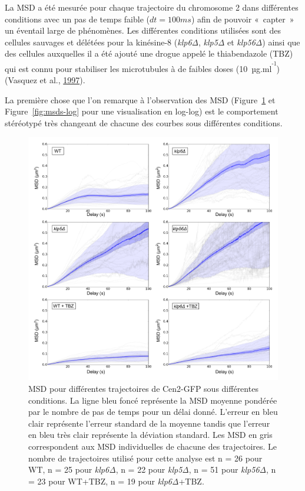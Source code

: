 \documentclass[12pt,a4paper,twoside,openright]{book}
\begin{document}
La MSD a été mesurée pour chaque trajectoire du chromosome 2 dans
différentes conditions avec un pas de temps faible (\(dt=100ms\)) afin
de pouvoir «~capter~» un éventail large de phénomènes. Les différentes
conditions utilisées sont des cellules sauvages et délétées pour la
kinésine-8 (\emph{klp6Δ}, \emph{klp5Δ} et \emph{klp56Δ}) ainsi que des
cellules auxquelles il a été ajouté une drogue appelé le thiabendazole
(TBZ) qui est connu pour stabiliser les microtubules à de faibles doses
(10~µg.ml\textsuperscript{\textsuperscript{-1}}) (Vasquez et al.,
\protect\hyperlink{ref-Vasquez1997}{1997}).

La première chose que l'on remarque à l'observation des MSD
(Figure~\ref{fig:msds} et Figure~\ref{fig:msds-log} pour une
visualisation en log-log) est le comportement stéréotypé très changeant
de chacune des courbes sous différentes conditions.

\begin{figure}[htbp]
\centering
\includegraphics{figures/results/imaging/msds.png}
\caption[MSD pour différentes trajectoires de Cen2-GFP sous différentes conditions.]{\label{fig:msds}MSD
pour différentes trajectoires de Cen2-GFP sous différentes conditions.
La ligne bleu foncé représente la MSD moyenne pondérée par le nombre de
pas de temps pour un délai donné. L'erreur en bleu clair représente
l'erreur standard de la moyenne tandis que l'erreur en bleu très clair
représente la déviation standard. Les MSD en gris correspondent aux MSD
individuelles de chacune des trajectoires. Le nombre de trajectoires
utilisé pour cette analyse est n = 26 pour WT, n = 25 pour \emph{klp6Δ},
n = 22 pour \emph{klp5Δ}, n = 51 pour \emph{klp56Δ}, n = 23 pour WT+TBZ,
n = 19 pour \emph{klp6Δ}+TBZ.}
\end{figure}
\end{document}
